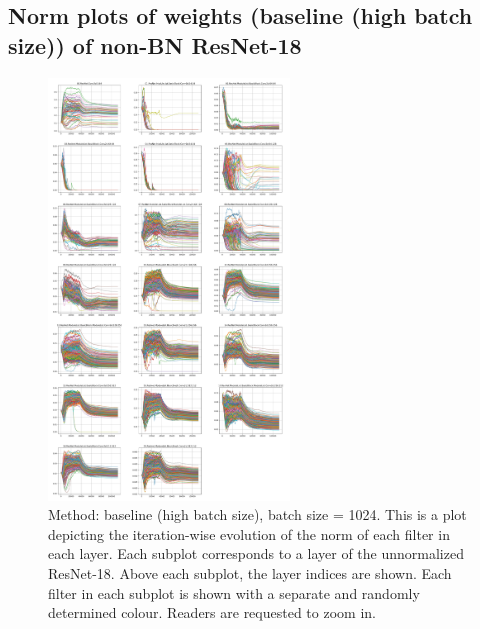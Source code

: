\documentclass[runningheads]{llncs}
\begin{document}
\subsection{Norm plots of weights (baseline (high batch size)) of non-BN ResNet-18}
\label{sec:plots2}
\begin{figure}[ht] \centering
\includegraphics[width=0.57\textwidth]{baseline_high_bs-w_norm} \caption{ Method:
baseline (high batch size), batch size = 1024. This is a plot depicting the
iteration-wise evolution of the norm of each filter in each layer. Each subplot
corresponds to a layer of the unnormalized ResNet-18. Above each subplot, the layer
indices are shown. Each filter in each subplot is shown with a separate and randomly
determined colour. Readers are requested to zoom in. } \end{figure}

\clearpage
\end{document}
